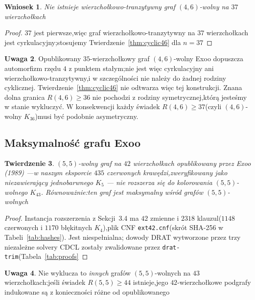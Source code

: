 \documentclass[11pt]{article}
\newtheorem{theorem}{Twierdzenie}
\newtheorem{corollary}[theorem]{Wniosek}
\theoremstyle{definition}
\newtheorem{remark}[theorem]{Uwaga}
\theoremstyle{plain}
\newcommand{\K}{\ensuremath{K}}
\newcommand{\R}[2]{\ensuremath{R(#1,#2)}}
\begin{document}
\begin{corollary}\label{cor:vt46}
Nie istnieje wierzchołkowo-tranzytywny graf $(4,6)$-wolny na $37$ wierzchołkach\end{corollary}

\begin{proof}
$37$ jest pierwsze,więc graf wierzchołkowo-tranzytywny na $37$ wierzchołkach jest cyrkulacyjny;stosujemy Twierdzenie~\ref{thm:cyclic46} dla $n = 37$\end{proof}

\begin{remark}\label{rem:exoo35}
Opublikowany $35$-wierzchołkowy graf $(4,6)$-wolny Exoo dopuszcza automorfizm rzędu $4$ z punktem stałym;nie jest więc cyrkulacyjny ani wierzchołkowo-tranzytywny,i w szczególności nie należy do żadnej rodziny cyklicznej.
Twierdzenie~\ref{thm:cyclic46} nie odtwarza więc tej konstrukcji.
Znana dolna granica $\R{4}{6} \ge 36$ nie pochodzi z rodziny symetrycznej,którą jesteśmy w stanie wykluczyć.
W konsekwencji każdy świadek $\R{4}{6} \ge 37$(czyli $(4,6)$-wolny $\K_{36}$)musi być podobnie asymetryczny.
\end{remark}

\subsection{Maksymalność grafu Exoo}\label{sec:resexoo}

\begin{theorem}\label{thm:exoo}
$(5,5)$-wolny graf na $42$ wierzchołkach opublikowany przez Exoo (1989) ---w naszym eksporcie $435$ czerwonych krawędzi,zweryfikowany jako niezawierający jednobarwnego $\K_5$ --- nie rozszerza się do kolorowania $(5,5)$-wolnego $\K_{43}$. Równoważnie:ten graf jest maksymalny wśród grafów $(5,5)$-wolnych\end{theorem}

\begin{proof}
Instancja rozszerzenia z Sekcji~3.4 ma $42$ zmienne i $2318$ klauzul($1148$ czerwonych i $1170$ błękitnych $\K_4$),plik CNF \texttt{ext42.cnf}(skrót SHA-256 w Tabeli~\ref{tab:hashes}). Jest niespełnialna; dowody DRAT wytworzone przez trzy niezależne solvery CDCL zostały zwalidowane przez \texttt{drat-trim}(Tabela~\ref{tab:proofs}\end{proof}

\begin{remark}
Nie wyklucza to \emph{innych} grafów $(5,5)$-wolnych na $43$ wierzchołkach:jeśli świadek $\R{5}{5} \ge 44$ istnieje,jego $42$-wierzchołkowe podgrafy indukowane są z konieczności różne od opublikowanego\end{remark}
\end{document}
